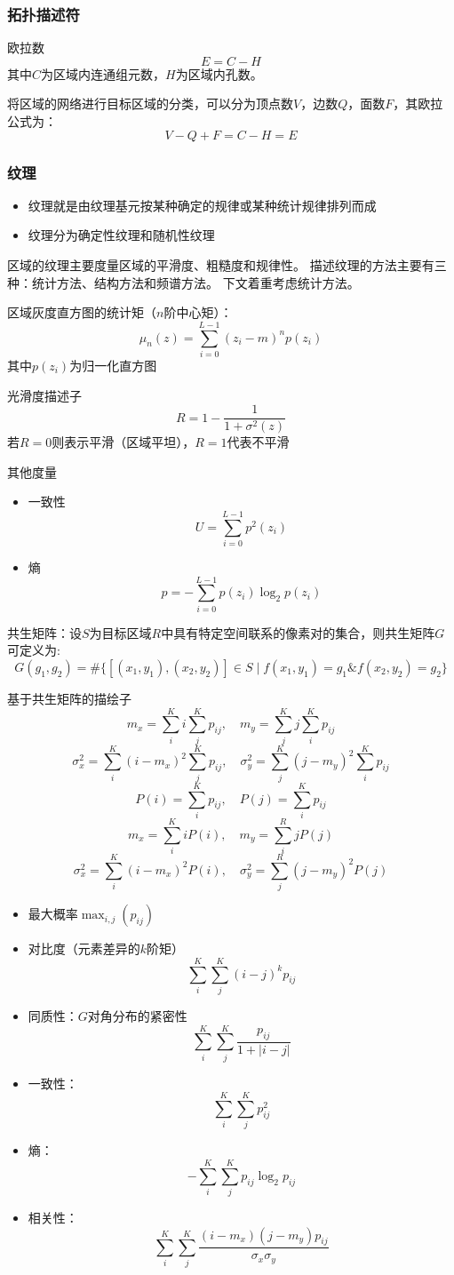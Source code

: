 \subsubsection{拓扑描述符}
欧拉数
\[E=C-H\]
其中$C$为区域内连通组元数，$H$为区域内孔数。

将区域的网络进行目标区域的分类，可以分为顶点数$V$，边数$Q$，面数$F$，其欧拉公式为：
\[V-Q+F=C-H=E\]


\subsubsection{纹理}
\begin{itemize}
	\item 纹理就是由纹理基元按某种确定的规律或某种统计规律排列而成
	\item 纹理分为确定性纹理和随机性纹理
\end{itemize}

区域的纹理主要度量区域的平滑度、粗糙度和规律性。
描述纹理的方法主要有三种：统计方法、结构方法和频谱方法。
下文着重考虑统计方法。

区域灰度直方图的统计矩（$n$阶中心矩）：
\[\mu_n(z)=\sum_{i=0}^{L-1}(z_i-m)^np(z_i)\]
其中$p(z_i)$为归一化直方图

光滑度描述子
\[R=1-\frac{1}{1+\sigma^2(z)}\]
若$R=0$则表示平滑（区域平坦），$R=1$代表不平滑

其他度量
\begin{itemize}
	\item 一致性
	\[U=\sum_{i=0}^{L-1}p^2(z_i)\]
	\item 熵
	\[p=-\sum_{i=0}^{L-1}p(z_i)\log_2p(z_i)\]
\end{itemize}

共生矩阵：设$S$为目标区域$R$中具有特定空间联系的像素对的集合，则共生矩阵$G$可定义为:
\[G(g_1,g_2)=\#\{[(x_1,y_1),(x_2,y_2)]\in S\mid f(x_1,y_1)=g_1 \& f(x_2,y_2)=g_2\}\]

基于共生矩阵的描绘子
\[m_{x}=\sum_{i}^{K} i \sum_{j}^{K} p_{ij}, \quad m_{y}=\sum_{j}^{K} j \sum_{i}^{K} p_{ij}\]
\[\sigma_{x}^{2}=\sum_{i}^{K}\left(i-m_{x}\right)^{2} \sum_{j}^{K} p_{ij}, \quad \sigma_{y}^{2}=\sum_{j}^{K}\left(j-m_{y}\right)^{2} \sum_{i}^{K} p_{ij}\]
\[P(i)=\sum_{i}^{K} p_{ij}, \quad P(j)=\sum_{i}^{K} p_{ij}\]
\[m_{x}=\sum_{i}^{K} iP(i), \quad m_{y}=\sum_{i}^{R} jP(j)\]
\[\sigma_{x}^{2}=\sum_{i}^{K}\left(i-m_{x}\right)^{2} P(i), \quad \sigma_{y}^{2}=\sum_{j}^{R}\left(j-m_{y}\right)^{2} P(j)\]
\begin{itemize}
	\item 最大概率$\max_{i,j}(p_{ij})$
	\item 对比度（元素差异的$k$阶矩）
	\[\sum_i^K\sum_j^K(i-j)^kp_{ij}\]
	\item 同质性：$G$对角分布的紧密性
	\[\sum_i^K\sum_j^K \frac{p_{ij}}{1+|i-j|}\]
	\item 一致性：
	\[\sum_i^K\sum_j^K p_{ij}^2\]
	\item 熵：
	\[-\sum_i^K\sum_j^K p_{ij}\log_2 p_{ij}\]
	\item 相关性：
	\[\sum_i^K\sum_j^K\frac{(i-m_x)(j-m_y)p_{ij}}{\sigma_x\sigma_y}\]
\end{itemize}

